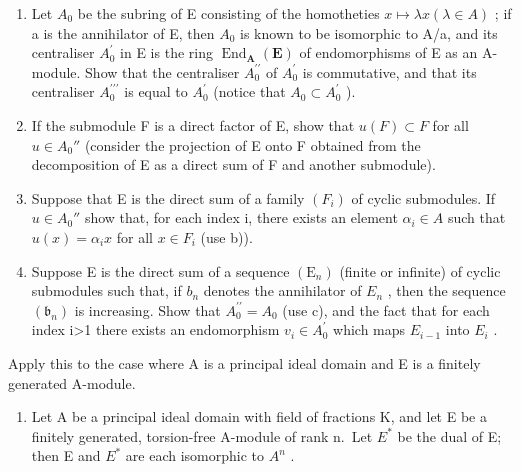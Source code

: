 \begin{enumerate}
\def\labelenumi{\alph{enumi})}
\item
  Let \(A_{0}\) be the subring of E consisting of the homotheties \(x \mapsto \lambda x (\lambda \in A)\) ; if a is the annihilator of E, then \(A_{0}\) is known to be isomorphic to A/a, and its centraliser \(A_{0}^{\prime}\) in E is the ring \(\operatorname{End}_{\mathbf{A}}(\mathbf{E})\) of endomorphisms of E as an A-module. Show that the centraliser \(A_{0}^{\prime\prime}\) of \(A_{0}^{\prime}\) is commutative, and that its centraliser \(A_{0}^{\prime\prime\prime}\) is equal to \(A_{0}^{\prime}\) (notice that \(A_{0} \subset A_{0}^{\prime}\) ).
\item
  If the submodule F is a direct factor of E, show that \(u(F) \subset F\) for all \(u \in A_{0}''\) (consider the projection of E onto F obtained from the decomposition of E as a direct sum of F and another submodule).
\item
  Suppose that E is the direct sum of a family \((F_{i})\) of cyclic submodules. If \(u \in A_{0}''\) show that, for each index i, there exists an element \(\alpha_{i} \in A\) such that \(u(x) = \alpha_{i}x\) for all \(x \in F_{i}\) (use b)).
\item
  Suppose E is the direct sum of a sequence \((\mathrm{E}_{n})\) (finite or infinite) of cyclic submodules such that, if \(b_{n}\) denotes the annihilator of \(E_{n}\) , then the sequence \((\mathfrak{b}_{n})\) is increasing. Show that \(A_{0}^{\prime\prime}=A_{0}\) (use c), and the fact that for each index i\textgreater1 there exists an endomorphism \(v_{i}\in A_{0}^{\prime}\) which maps \(E_{i-1}\) into \(E_{i}\) .
\end{enumerate}

Apply this to the case where A is a principal ideal domain and E is a finitely generated A-module.

\begin{enumerate}
\def\labelenumi{\arabic{enumi})}
\setcounter{enumi}{6}
\tightlist
\item
  Let A be a principal ideal domain with field of fractions K, and let E be a finitely generated, torsion-free A-module of rank n.~Let \(E^{*}\) be the dual of E; then E and \(E^{*}\) are each isomorphic to \(A^{n}\) .
\end{enumerate}

